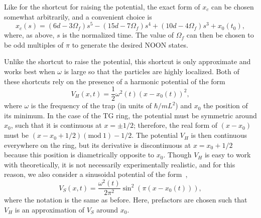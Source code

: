Like for the shortcut for raising the potential, the exact form of $x_c$ can be chosen somewhat arbitrarily, and a convenient choice is
\begin{equation}
 x_c(s)= (6 d -3 \Omega_f )s^5 - (15 d-7 \Omega_f )s^4+(10d-4 \Omega_f) s^3 + x_0(t_0),
\end{equation}
where, as above, $s$ is the normalized time.
The value of $\Omega_f$ can then be chosen to be odd multiples of $\pi$ to generate the desired NOON states.

Unlike the shortcut to raise the potential, this shortcut is only approximate and works best when $\omega$ is large so that the particles are highly localized.
Both of these shortcuts rely on the presence of a harmonic potential of the form
\begin{equation}
 V_{H}(x,t)=\frac 1 2 \omega^2(t) \left( x-x_0(t)\right)^2, 
\end{equation}
where  $\omega$ is the frequency of the trap (in units of $\hbar/mL^2$) and $x_0$ the position of its minimum.
In the case of the TG ring, the potential must be symmetric around $x_0$, such that it is continuous at $x=\pm 1/2$; therefore, the real form of $(x-x_0)$ must be $(x-x_0+1/2)(\mathrm{mod~} 1)-1/2$.
The potential $V_H$ is then continuous everywhere on the ring, but its derivative is discontinuous at $x=x_0+1/2$ because this position is diametrically opposite to $x_0$.
Though $V_H$ is easy to work with theoretically, it is not necessarily experimentally realistic, and for this reason, we also consider a sinusoidal potential of the form~\cite{phelan2013,masuda2014},
\begin{equation}
 V_{S}(x,t)= \frac{\omega^2(t)}{2 \pi^2} \sin^2 \left(\pi \left( x-x_0(t)\right) \right) ,
\end{equation}
where the notation is the same as before. 
Here, prefactors are chosen such that $V_{H}$ is an approximation of $V_S$ around $x_0$.

